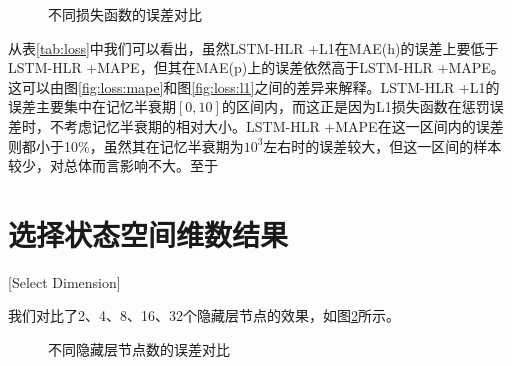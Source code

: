 \begin{figure}[htbp]
    \centering
    \begin{minipage}{\textwidth}
    \centering
    \subfigure{\label{fig:loss:mape}}\addtocounter{subfigure}{-2}
    \hspace{2em}
    \subfigure{\label{fig:loss:l1}}\addtocounter{subfigure}{-2}
    \hspace{2em}    \end{minipage}    
    \vspace{0.2em}
    \caption{不同损失函数的误差对比}
    \label{fig:loss}
\end{figure}

从表\ref{tab:loss}中我们可以看出，虽然LSTM-HLR +L1在MAE(h)的误差上要低于LSTM-HLR +MAPE，但其在MAE(p)上的误差依然高于LSTM-HLR +MAPE。这可以由图\ref{fig:loss:mape}和图\ref{fig:loss:l1}之间的差异来解释。LSTM-HLR +L1的误差主要集中在记忆半衰期$[0,10]$的区间内，而这正是因为L1损失函数在惩罚误差时，不考虑记忆半衰期的相对大小。LSTM-HLR +MAPE在这一区间内的误差则都小于10\%，虽然其在记忆半衰期为$10^3$左右时的误差较大，但这一区间的样本较少，对总体而言影响不大。至于

\section{选择状态空间维数结果}[Select Dimension]

我们对比了2、4、8、16、32个隐藏层节点的效果，如图\ref{fig:dimension}所示。

\begin{figure}[htbp]
    \centering
    \begin{minipage}{\textwidth}
    \centering
    \subfigure{\label{fig:dimension:train}}\addtocounter{subfigure}{-2}
    \hspace{2em}
    \subfigure{\label{fig:dimension:test}}\addtocounter{subfigure}{-2}
    \end{minipage}
    \centering
    \begin{minipage}{\textwidth}
    \centering
    \subfigure{\label{fig:dimension:smooth}}\addtocounter{subfigure}{-2}
    \hspace{2em}
    \subfigure{\label{fig:dimension:trand}}\addtocounter{subfigure}{-2}
    \end{minipage}
    \vspace{0.2em}
    \caption{不同隐藏层节点数的误差对比}
    \label{fig:dimension}
\end{figure}

